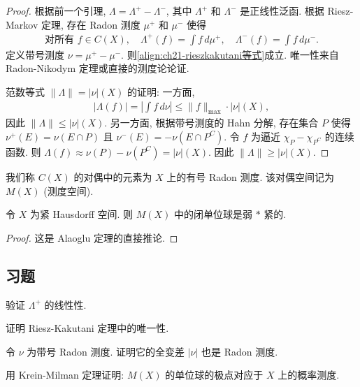 \documentclass[../../main.tex]{subfiles}
\begin{document}
\begin{proof}
根据前一个引理, $\Lambda=\Lambda^{+}-\Lambda^{-}$, 其中 $\Lambda^{+}$ 和 $\Lambda^{-}$ 是正线性泛函. 根据 Riesz-Markov 定理, 存在 Radon 测度 $\mu^{+}$ 和 $\mu^{-}$ 使得
\begin{align*}
\text{对所有 }f\in C(X),\quad\Lambda^{+}(f)=\int f\,d\mu^{+},\quad\Lambda^{-}(f)=\int f\,d\mu^{-}.
\end{align*}
定义带号测度 $\nu=\mu^{+}-\mu^{-}$. 则\eqref{align:ch21-rieszkakutani等式}成立. 唯一性来自 Radon-Nikodym 定理或直接的测度论论证.

范数等式 $\|\Lambda\|=|\nu|(X)$ 的证明: 一方面,
\begin{align*}
|\Lambda(f)|=\left|\int f\,d\nu\right|\leqslant\|f\|_{\max}\cdot|\nu|(X),
\end{align*}
因此 $\|\Lambda\|\leqslant|\nu|(X)$. 另一方面, 根据带号测度的 Hahn 分解, 存在集合 $P$ 使得 $\nu^{+}(E)=\nu(E\cap P)$ 且 $\nu^{-}(E)=-\nu(E\cap P^{C})$. 令 $f$ 为逼近 $\chi_{P}-\chi_{P^{C}}$ 的连续函数. 则 $\Lambda(f)\approx\nu(P)-\nu(P^{C})=|\nu|(X)$. 因此 $\|\Lambda\|\geqslant|\nu|(X)$.
\end{proof}

我们称 $C(X)$ 的对偶中的元素为 $X$ 上的有号 Radon 测度. 该对偶空间记为 $M(X)$ (测度空间).

\begin{corollary}\label{corollary:ch21-弱星紧}
令 $X$ 为紧 Hausdorff 空间. 则 $M(X)$ 中的闭单位球是弱 $*$ 紧的.
\end{corollary}

\begin{proof}
这是 Alaoglu 定理的直接推论.
\end{proof}

\subsection*{习题}

\begin{exercise}\label{exercise:ch21-31}
验证 $\Lambda^{+}$ 的线性性.
\end{exercise}

\begin{exercise}\label{exercise:ch21-32}
证明 Riesz-Kakutani 定理中的唯一性.
\end{exercise}

\begin{exercise}\label{exercise:ch21-33}
令 $\nu$ 为带号 Radon 测度. 证明它的全变差 $|\nu|$ 也是 Radon 测度.
\end{exercise}

\begin{exercise}\label{exercise:ch21-34}
用 Krein-Milman 定理证明: $M(X)$ 的单位球的极点对应于 $X$ 上的概率测度.
\end{exercise}
\end{document}
